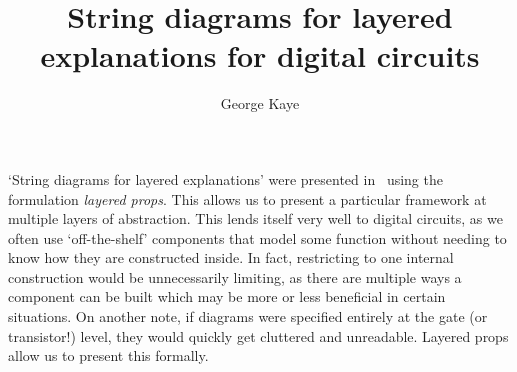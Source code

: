 \documentclass[10pt, a4paper]{article}
\title{String diagrams for layered explanations for digital circuits}
\author{George Kaye}
\date{}
\begin{document}
    \maketitle

    `String diagrams for layered explanations' were presented in~\cite{lobski2022string} using the formulation \emph{layered props}.
    This allows us to present a particular framework at multiple layers of abstraction.
    This lends itself very well to digital circuits, as we often use `off-the-shelf' components that model some function without needing to know how they are constructed inside.
    In fact, restricting to one internal construction would be unnecessarily limiting, as there are multiple ways a component can be built which may be more or less beneficial in certain situations.
    On another note, if diagrams were specified entirely at the gate (or transistor!) level, they would quickly get cluttered and unreadable.
    Layered props allow us to present this formally.

    \printbibliography
\end{document}
